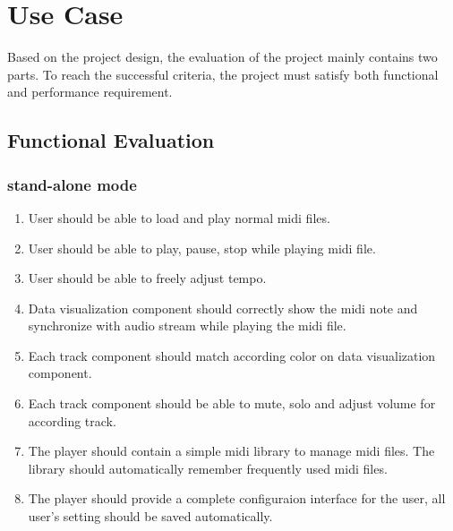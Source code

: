 
\chapter{Use Case} %



\ifpdf
    \graphicspath{{X/figures/PNG/}{X/figures/PDF/}{X/figures/}}
\else
    \graphicspath{{X/figures/EPS/}{X/figures/}}
\fi



Based on the project design, the evaluation of the project mainly contains two parts. To reach the
successful criteria, the project must satisfy both functional and performance requirement.

\section{Functional Evaluation}
\subsection{stand-alone mode}
\begin{enumerate}
  \item User should be able to load and play normal midi files.
  \item User should be able to play, pause, stop while playing midi file.  
  \item User should be able to freely adjust tempo.  
  \item Data visualization component should correctly show the midi note 
        and synchronize with audio stream while playing the midi file.
  \item Each track component should match according color on data visualization component.
  \item Each track component should be able to mute, solo and adjust 
        volume for according track.  
  \item The player should contain a simple midi library to manage midi files. 
        The library should automatically remember frequently used midi files.
  \item The player should provide a complete configuraion interface for the 
        user, all user's setting should be saved automatically.
\end{enumerate}

